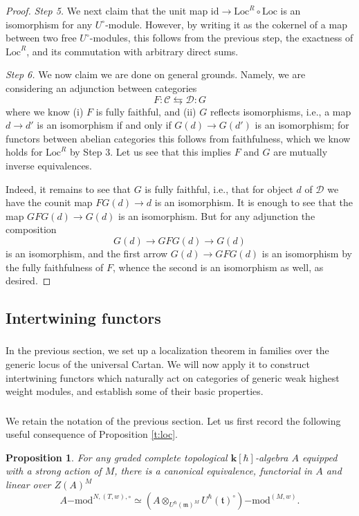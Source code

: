 \documentclass{amsart}
\newtheorem{Prop}[Thm]{Proposition}
\theoremstyle{definition}
\newcommand{\fm}{\mathfrak{m}}
\newcommand{\lmod}{\on{-mod}}
\newcommand{\sC}{\mathscr{C}}
\newcommand{\sss}{\subsubsection{}}
\newcommand{\ft}{\mathfrak{t}}
\newcommand{\sD}{\mathscr{D}}
\newcommand{\on}{\mathrm}
\newcommand{\bk}{\mathbf{k}}
\numberwithin{equation}{section}
\begin{document}
\begin{proof}
{\em \noindent Step 5.} We next claim that the unit map $\on{id} \rightarrow \on{Loc}^R \circ \on{Loc}$ is an isomorphism for any $U^\circ$-module. However, by writing it as the cokernel of a map between two free $U^\circ$-modules, this follows from the previous step, the exactness of $\on{Loc}^R$, and its commutation with arbitrary direct sums. 

{\em \noindent Step 6.} We now claim we are done on general grounds. Namely, we are considering an adjunction between categories
$$F: \sC \leftrightarrows \sD: G$$
where we know (i) $F$ is fully faithful, and (ii) $G$ reflects isomorphisms, i.e., a map $d \rightarrow d'$ is an isomorphism if and only if $G(d) \rightarrow G(d')$ is an isomorphism; for functors between abelian categories this follows from faithfulness, which we know holds for 
 $\on{Loc}^R$ by Step 3. Let us see that this implies $F$ and $G$ are mutually inverse equivalences. 

Indeed, it remains to see that $G$ is fully faithful, i.e., that for object $d$ of $\sD$ we have the counit map $FG(d) \rightarrow d$ is an isomorphism. It is enough to see that the map $GFG(d) \rightarrow G(d)$ is an isomorphism. But for any adjunction the composition $$G(d) \rightarrow GFG(d) \rightarrow G(d)$$is an isomorphism, and the first arrow $G(d) \rightarrow GFG(d)$ is an isomorphism by the fully faithfulness of $F$, whence the second is an isomorphism as well, as desired. \end{proof}


\subsection{Intertwining functors}\label{SS_intertwining}

\sss In the previous section, we set up a localization theorem in families over the generic locus of the universal Cartan. We will now apply it to construct intertwining functors which naturally act on categories of generic weak highest weight modules, and establish some of their basic properties. 

\sss We retain the notation of the previous section. Let us first record the following useful consequence of Proposition \ref{t:loc}. 


\begin{Prop}\label{p:loc} For any graded complete topological $\bk[\hbar]$-algebra $A$ equipped with a strong action of $M$, there is a canonical equivalence, functorial in $A$ and linear over $Z(A)^M$
$$A\lmod^{N, (T,w), \circ} \simeq (A  \otimes_{U^\hbar(\fm)^M} U^\hbar(\ft)^\circ)\lmod^{(M, w)}.$$
\end{Prop}
\end{document}
